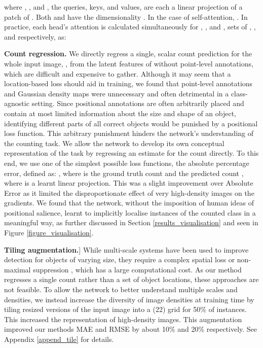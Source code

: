 \documentclass[letterpaper, 11pt]{IEEEtran}
\begin{document}
where , , and , the queries, keys, and values, are each a linear projection of a patch of . 
Both  and  have the dimensionality . In the case of self-attention, .
In practice, each head's attention is calculated simultaneously for , , and , sets of , , and  respectively, as:


\textbf{Count regression.}
We directly regress a single, scalar count prediction
for the whole input image, , from the latent features of  without point-level annotations, which are difficult and expensive to gather.
Although it may seem that a location-based loss should aid in training, we found that point-level annotations and Gaussian density maps were unnecessary and often detrimental in a class-agnostic setting. 
Since positional annotations are often arbitrarily placed and contain at most limited information about the size and shape of an object, identifying different parts of all correct objects would be punished by a positional loss function. This arbitrary punishment hinders the network's understanding of the counting task.
We allow the network to develop its own conceptual representation of the task by regressing an estimate for the count directly. To this end, we use one of the simplest possible loss functions, the absolute percentage error, defined as: , where  is the ground truth count and the predicted count , where  is a learnt linear projection. This was a slight improvement over Absolute Error as it limited the disproportionate effect of very high-density images on the gradients.
We found that the network, without the imposition of human ideas of positional salience, learnt to implicitly localise instances of the counted class in a meaningful way, as further discussed in Section \ref{results_visualisation} and seen in Figure \ref{figure_visualisation}.

\textbf{Tiling augmentation.}]
While multi-scale systems have been used to improve detection for objects of varying size, they require a complex spatial loss \cite{redmon2016YOLO} or non-maximal suppression \cite{ren2015fasterrcnn}, which has a large computational cost.
As our method regresses a single count rather than a set of object locations, these approaches are not feasible.
To allow the network to better understand  multiple scales and densities, we instead increase the diversity of image densities at training time by tiling resized versions of the input image into a (22) grid for 50\% of instances.  This increased the representation of high-density images.
This augmentation improved our methods MAE and RMSE by about 10\% and 20\% respectively. See Appendix \ref{append_tile} for details.
\end{document}
